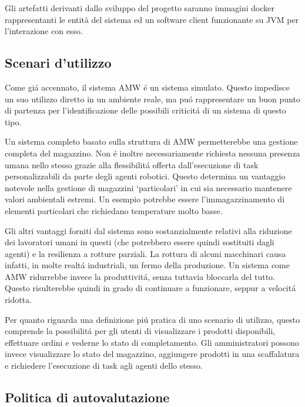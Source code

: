Gli artefatti derivanti dallo sviluppo del progetto saranno immagini docker rappresentanti le entità del sistema ed un software client funzionante su JVM per l'interazione con esso.

\subsection{Scenari d'utilizzo}

Come gi\'a accennato, il sistema AMW \'e un sistema simulato. Questo impedisce un suo utilizzo diretto in un ambiente reale, ma pu\'o rappresentare un buon punto di partenza per l'identificazione delle possibili criticit\'a di un sistema di questo tipo.

Un sistema completo basato sulla struttura di AMW permetterebbe una gestione completa del magazzino. Non \'e inoltre necessariamente richiesta nessuna presenza umana nello stesso grazie alla flessibilit\'a offerta dall'esecuzione di task personalizzabili da parte degli agenti robotici. Questo determina un vantaggio notevole nella gestione di magazzini `particolari' in cui sia necessario mantenere valori ambientali estremi. Un esempio potrebbe essere l'immagazzinamento di elementi particolari che richiedano temperature molto basse.

Gli altri vantaggi forniti dal sistema sono sostanzialmente relativi alla riduzione dei lavoratori umani in questi (che potrebbero essere quindi sostituiti dagli agenti) e la resilienza a rotture parziali. La rottura di alcuni macchinari causa infatti, in molte realt\'a industriali, un fermo della produzione. Un sistema come AMW ridurrebbe invece la produttivit\'a, senza tuttavia bloccarla del tutto. Questo risulterebbe quindi in grado di continuare a funzionare, seppur a velocit\'a ridotta.

\parag
Per quanto riguarda una definizione pi\'u pratica di uno scenario di utilizzo, questo comprende la possibilit\'a per gli utenti di visualizzare i prodotti disponibili, effettuare ordini e vederne lo stato di completamento. Gli amministratori possono invece visualizzare lo stato del magazzino, aggiungere prodotti in una scaffalatura e richiedere l'esecuzione di task agli agenti dello stesso.

\subsection{Politica di autovalutazione}

